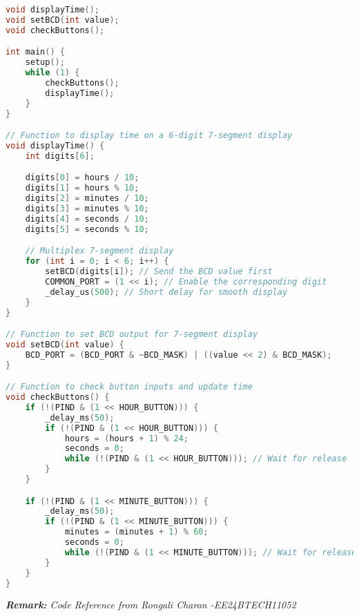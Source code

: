 \documentclass[journal]{IEEEtran}
\begin{document}
\begin{lstlisting}[language=C,caption=Complete Source Code]
void displayTime();
void setBCD(int value);
void checkButtons();

int main() {
    setup();
    while (1) {
        checkButtons();
        displayTime();
    }
}

// Function to display time on a 6-digit 7-segment display
void displayTime() {
    int digits[6];

    digits[0] = hours / 10;
    digits[1] = hours % 10;
    digits[2] = minutes / 10;
    digits[3] = minutes % 10;
    digits[4] = seconds / 10;
    digits[5] = seconds % 10;

    // Multiplex 7-segment display
    for (int i = 0; i < 6; i++) {
        setBCD(digits[i]); // Send the BCD value first
        COMMON_PORT = (1 << i); // Enable the corresponding digit
        _delay_us(500); // Short delay for smooth display
    }
}

// Function to set BCD output for 7-segment display
void setBCD(int value) {
    BCD_PORT = (BCD_PORT & ~BCD_MASK) | ((value << 2) & BCD_MASK);
}

// Function to check button inputs and update time
void checkButtons() {
    if (!(PIND & (1 << HOUR_BUTTON))) {
        _delay_ms(50);
        if (!(PIND & (1 << HOUR_BUTTON))) {
            hours = (hours + 1) % 24;
            seconds = 0;
            while (!(PIND & (1 << HOUR_BUTTON))); // Wait for release
        }
    }

    if (!(PIND & (1 << MINUTE_BUTTON))) {
        _delay_ms(50);
        if (!(PIND & (1 << MINUTE_BUTTON))) {
            minutes = (minutes + 1) % 60;
            seconds = 0;
            while (!(PIND & (1 << MINUTE_BUTTON))); // Wait for release
        }
    }
}

\end{lstlisting}
\textit{\textbf{Remark:} Code Reference from Rongali Charan -EE24BTECH11052}
\end{document}
